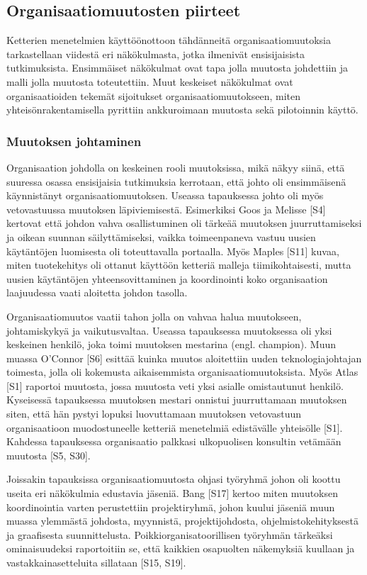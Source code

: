 \subsection{Organisaatiomuutosten piirteet}

Ketterien menetelmien käyttöönottoon tähdänneitä organisaatiomuutoksia
tarkastellaan viidestä eri näkökulmasta, jotka ilmenivät ensisijaisista
tutkimuksista. Ensimmäiset näkökulmat ovat tapa jolla muutosta johdettiin ja
malli jolla muutosta toteutettiin. Muut keskeiset näkökulmat ovat
organisaatioiden tekemät sijoitukset organisaatiomuutokseen, miten
yhteisönrakentamisella pyrittiin ankkuroimaan muutosta sekä pilotoinnin käyttö.

\subsubsection{Muutoksen johtaminen}

Organisaation johdolla on keskeinen rooli muutoksissa, mikä näkyy siinä, että
suuressa osassa ensisijaisia tutkimuksia kerrotaan, että johto oli ensimmäisenä
käynnistänyt organisaatiomuutoksen. Useassa tapauksessa johto oli myös
vetovastuussa muutoksen läpiviemisestä. Esimerkiksi Goos ja Melisse [S4]
kertovat että johdon vahva osallistuminen oli tärkeää muutoksen juurruttamiseksi
ja oikean suunnan säilyttämiseksi, vaikka toimeenpaneva vastuu uusien
käytäntöjen luomisesta oli toteuttavalla portaalla. Myös Maples [S11] kuvaa,
miten tuotekehitys oli ottanut käyttöön ketteriä malleja tiimikohtaisesti, mutta
uusien käytäntöjen yhteensovittaminen ja koordinointi koko organisaation
laajuudessa vaati aloitetta johdon tasolla.

Organisaatiomuutos vaatii tahon jolla on vahvaa halua muutokseen, johtamiskykyä
ja vaikutusvaltaa. Useassa tapauksessa muutoksessa oli yksi keskeinen henkilö,
joka toimi muutoksen mestarina (engl. champion). Muun muassa O'Connor [S6]
esittää kuinka muutos aloitettiin uuden teknologiajohtajan toimesta, jolla oli
kokemusta aikaisemmista organisaatiomuutoksista. Myös Atlas [S1] raportoi
muutosta, jossa muutosta veti yksi asialle omistautunut henkilö. Kyseisessä
tapauksessa muutoksen mestari onnistui juurruttamaan muutoksen siten, että hän
pystyi lopuksi luovuttamaan muutoksen vetovastuun organisaatioon muodostuneelle
ketteriä menetelmiä edistävälle yhteisölle [S1]. Kahdessa tapauksessa
organisaatio palkkasi ulkopuolisen konsultin vetämään muutosta [S5, S30].

Joissakin tapauksissa organisaatiomuutosta ohjasi työryhmä johon oli koottu
useita eri näkökulmia edustavia jäseniä. Bang [S17] kertoo miten muutoksen
koordinointia varten perustettiin projektiryhmä, johon kuului jäseniä muun
muassa ylemmästä johdosta, myynnistä, projektijohdosta, ohjelmistokehityksestä
ja graafisesta suunnittelusta. Poikkiorganisatoorillisen työryhmän tärkeäksi
ominaisuudeksi raportoitiin se, että kaikkien osapuolten näkemyksiä kuullaan ja
vastakkainasetteluita sillataan [S15, S19].

